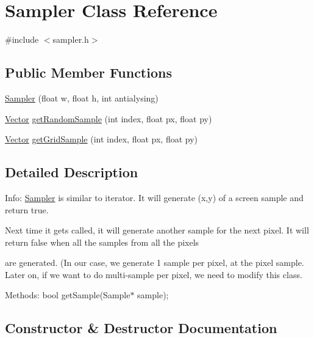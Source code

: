 \hypertarget{class_sampler}{}\section{Sampler Class Reference}
\label{class_sampler}


{\ttfamily \#include $<$sampler.\+h$>$}

\subsection*{Public Member Functions}
\begin{DoxyCompactItemize}
\item 
\mbox{\hyperlink{class_sampler_a5a0ac9c4fee9777b28caad6befad9d79}{Sampler}} (float w, float h, int antialysing)
\item 
\mbox{\hyperlink{struct_vector}{Vector}} \mbox{\hyperlink{class_sampler_a0e3e399b62cf61f33d476a770b6ff2ef}{get\+Random\+Sample}} (int index, float px, float py)
\item 
\mbox{\hyperlink{struct_vector}{Vector}} \mbox{\hyperlink{class_sampler_a23190051e449961267baed73eb53d90b}{get\+Grid\+Sample}} (int index, float px, float py)
\end{DoxyCompactItemize}


\subsection{Detailed Description}
Info\+: \mbox{\hyperlink{class_sampler}{Sampler}} is similar to iterator. It will generate (x,y) of a screen sample and return true.

Next time it gets called, it will generate another sample for the next pixel. It will return false when all the samples from all the pixels

are generated. (In our case, we generate 1 sample per pixel, at the pixel sample. Later on, if we want to do multi-\/sample per pixel, we need to modify this class.

Methods\+: bool get\+Sample(\+Sample$\ast$ sample); 

\subsection{Constructor \& Destructor Documentation}
\mbox{\label{class_sampler_a5a0ac9c4fee9777b28caad6befad9d79}} 
